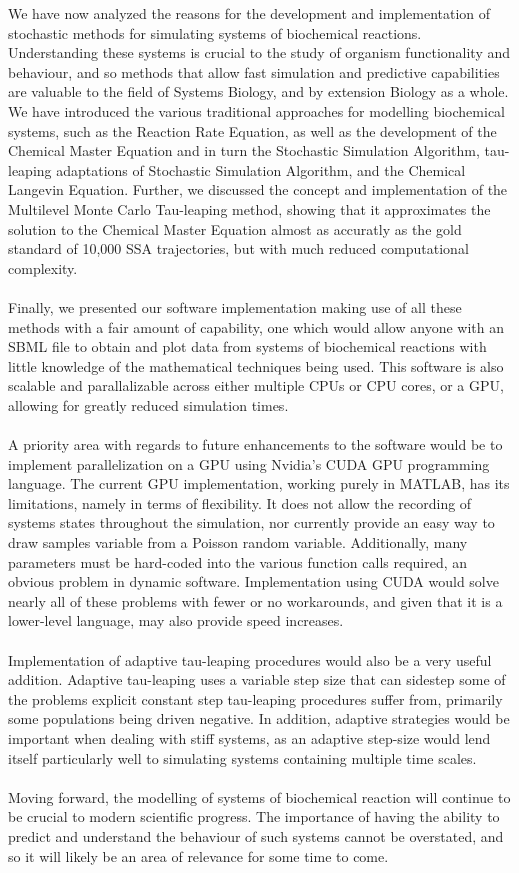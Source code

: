 \documentclass[ugrad,lot,lof,openright,11pt,oneside,onehalfspace]{RUthesis}
\begin{document}
	We have now analyzed the reasons for the development and implementation of stochastic methods for simulating systems of biochemical reactions. Understanding these systems is crucial to the study of organism functionality and behaviour, and so methods that allow fast simulation and predictive capabilities are valuable to the field of Systems Biology, and by extension Biology as a whole. We have introduced the various traditional approaches for modelling biochemical systems, such as the Reaction Rate Equation, as well as the development of the Chemical Master Equation and in turn the Stochastic Simulation Algorithm, tau-leaping adaptations of Stochastic Simulation Algorithm, and the Chemical Langevin Equation. Further, we discussed the concept and implementation of the Multilevel Monte Carlo Tau-leaping method, showing that it approximates the solution to the Chemical Master Equation almost as accuratly as the gold standard of 10,000 SSA trajectories, but with much reduced computational complexity.\\
	\\
	Finally, we presented our software implementation making use of all these methods with a fair amount of capability, one which would allow anyone with an SBML file to obtain and plot data from systems of biochemical reactions with little knowledge of the mathematical techniques being used. This software is also scalable and parallalizable across either multiple CPUs or CPU cores, or a GPU, allowing for greatly reduced simulation times.\\ 
	\\
	A priority area with regards to future enhancements to the software would be to implement parallelization on a GPU using Nvidia's CUDA GPU programming language. The current GPU implementation, working purely in MATLAB, has its limitations, namely in terms of flexibility. It does not allow the recording of systems states throughout the simulation, nor currently provide an easy way to draw samples variable from a Poisson random variable. Additionally, many parameters must be hard-coded into the various function calls required, an obvious problem in dynamic software. Implementation using CUDA would solve nearly all of these problems with fewer or no workarounds, and given that it is a lower-level language, may also provide speed increases.\\
	\\
	Implementation of adaptive tau-leaping procedures would also be a very useful addition. Adaptive tau-leaping uses a variable step size that can sidestep some of the problems explicit constant step tau-leaping procedures suffer from, primarily some populations being driven negative. In addition, adaptive strategies would be important when dealing with stiff systems, as an adaptive step-size would lend itself particularly well to simulating systems containing multiple time scales.\\
	\\
	Moving forward, the modelling of systems of biochemical reaction will continue to be crucial to modern scientific progress. The importance of having the ability to predict and understand the behaviour of such systems cannot be overstated, and so it will likely be an area of relevance for some time to come.
\end{document}
